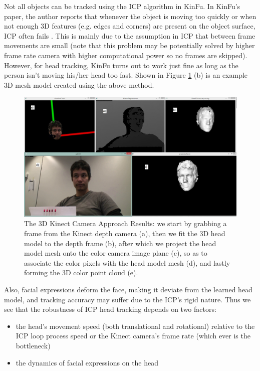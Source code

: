 \documentclass{ut-thesis}
\begin{document}
Not all objects can be tracked using the ICP algorithm in KinFu.  In KinFu's paper, the author reports that whenever the object is moving too quickly or when not enough 3D features (e.g. edges and corners) are present on the object surface, ICP often fails \cite{pirovano2011kinfu}.  This is mainly due to the assumption in ICP that between frame movements are small (note that this problem may be potentially solved by higher frame rate camera with higher computational power so no frames are skipped).  However, for head tracking, KinFu turns out to work just fine as long as the person isn't moving his/her head too fast.  Shown in Figure \ref{fig:headTrackingResults} (b) is an example 3D mesh model created using the above method.
\begin{figure} [h]
	\centering
	\includegraphics[width=\textwidth]{./img/headTrackingResults1.jpg}
	\caption{The 3D Kinect Camera Approach Results: we start by grabbing a frame from the Kinect depth camera (a), then we fit the 3D head model to the depth frame (b), after which we project the head model mesh onto the color camera image plane (c), so as to associate the color pixels with the head model mesh (d), and lastly forming the 3D color point cloud (e).}
	\label{fig:headTrackingResults}
\end{figure}

Also, facial expressions deform the face, making it deviate from the learned head model, and tracking accuracy may suffer due to the ICP's rigid nature.  Thus we see that the robustness of ICP head tracking depends on two factors:
\begin{itemize}
	\item the head's movement speed (both translational and rotational) relative to the ICP loop process speed or the Kinect camera's frame rate (which ever is the bottleneck)
	\item the dynamics of facial expressions on the head
\end{itemize}
\end{document}
